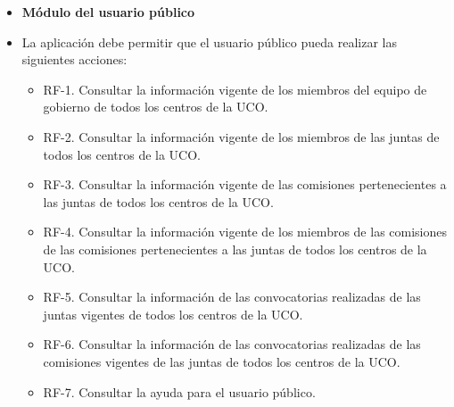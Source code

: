  \begin{itemize}
 \item \textbf{Módulo del usuario público}
 \item[] La aplicación debe permitir que el usuario público pueda realizar las siguientes acciones:
     \begin{itemize}
         \item RF-1. Consultar la información vigente de los miembros del equipo de gobierno de todos los centros de la UCO.
         \item RF-2. Consultar la información vigente de los miembros de las juntas de todos los centros de la UCO.
         \item RF-3. Consultar la información vigente de las comisiones pertenecientes a las juntas de todos los centros de la UCO.
         \item RF-4. Consultar la información vigente de los miembros de las comisiones de las comisiones pertenecientes a las juntas de todos los centros de la UCO.
         \item RF-5. Consultar la información de las convocatorias realizadas de las juntas vigentes de todos los centros de la UCO.
         \item RF-6. Consultar la información de las convocatorias realizadas de las comisiones vigentes de las juntas de todos los centros de la UCO.
         \item RF-7. Consultar la ayuda para el usuario público. 
     \end{itemize}


\end{itemize}
